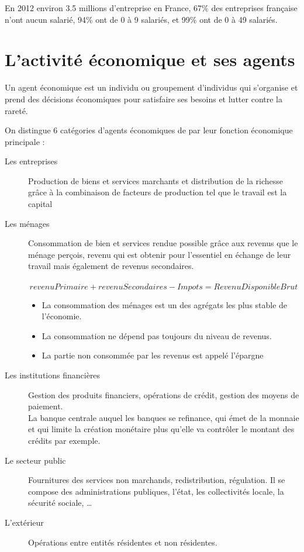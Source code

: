 	En 2012 environ 3.5 millions d'entreprise en France, 67\% des entreprises française n'ont aucun salarié, 94\% ont de 0 à 9 salariés, et 99\% ont de
	0 à 49 salariés.

	\section{L'activité économique et ses agents}
	\begin{definition}
		Un agent économique est un individu ou groupement d'individus qui s'organise et prend des décisions économiques pour satisfaire ses besoins et
		lutter contre la rareté.
	\end{definition}

	On distingue 6 catégories d'agents économiques de par leur fonction économique principale : 
	\begin{description}
		\item[Les entreprises]Production de biens et services marchants et distribution de la richesse grâce à la combinaison de facteurs de
			production tel que le travail est la capital
		\item[Les ménages] Consommation de bien et services rendue possible grâce aux revenus que le ménage perçois, revenu qui est obtenir pour
			l'essentiel en échange de leur travail mais également de revenus secondaires.\\~
			$$revenuPrimaire + revenuSecondaires - Impots = RevenuDisponibleBrut$$

			\begin{remarque}
				\begin{itemize}
					\item La consommation des ménages est un des agrégats les plus stable de l'économie.
					\item La consommation ne dépend pas toujours du niveau de revenus.
					\item La partie non consommée par les revenus est appelé l'épargne
				\end{itemize}
			\end{remarque}
		\item[Les institutions financières] Gestion des produits financiers, opérations de crédit, gestion des moyens de paiement.\\
			La banque centrale auquel les banques se refinance, qui émet de la monnaie et qui limite la création monétaire plus qu'elle va contrôler le
			montant des crédits par exemple.
		\item[Le secteur public] Fournitures des services non marchands, redistribution, régulation. Il se compose des administrations publiques,
			l'état, les collectivités locale, la sécurité sociale, \ldots 
		\item[L'extérieur] Opérations entre entités résidentes et non résidentes.
	\end{description}

